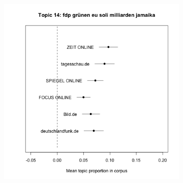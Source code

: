 \documentclass[12pt,a4paper,notitlepage]{article}
\begin{document}
\begin{figure}[H]
\begin{center}
\begin{subfigure}[normla]{0.2\textwidth}
		\end{subfigure}
		\begin{subfigure}[normla]{0.2\textwidth}
			\includegraphics[width=\textwidth]{../figs/estimate_effect14.png}
		\end{subfigure}
	\end{center}
	\label{fig_estimateEffects_full1}
\end{figure}
\end{document}
